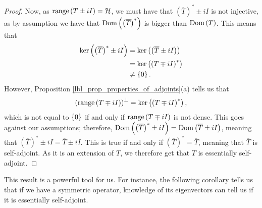 \begin{proof}
  Now, as $\operatorname{range}\left(T \pm iI\right) = \mathcal{H}$, we must have that $\left( \overline{T} \right)^* \pm iI$ is not injective, as by assumption we have that $\operatorname{Dom}\left(\left(\overline{T}\right)^*\right)$ is bigger than $\operatorname{Dom}\left(T\right)$. This means that
  \begin{align*}
    \operatorname{ker}\left(\left( \overline{T} \right)^* \pm iI\right)
    &=
    \operatorname{ker}\left(\left( \overline{T} \pm iI \right)\right) \\
    &=
    \operatorname{ker}\left(\left({T} \mp iI \right)^*\right) \\
    &\neq \left\{0\right\}.
  \end{align*}
  However, Proposition \eqref{lbl_prop_properties_of_adjoints}(a) tells us that
  \begin{equation*}
    \left( \operatorname{range}\left(T \mp iI\right) \right)^\perp
    =
    \operatorname{ker}\left(\left( T \mp iI \right)^*\right),
  \end{equation*}
  which is not equal to $\left\{0\right\}$ if and only if $\operatorname{range}\left(T \mp iI\right)$ is not dense. This goes against our assumptions; therefore, $\operatorname{Dom}\left(\left( \overline{T}\right)^* \pm iI\right) = \operatorname{Dom}\left(\overline{T} \pm iI\right)$, meaning that $ \left( \overline{T}\right)^* \pm iI = \overline{T} \pm iI $. This is true if and only if $\left( \overline{T}\right)^* = \overline{T}$, meaning that $\overline{T}$ is self-adjoint. As it is an extension of $T$, we therefore get that $T$ is essentially self-adjoint.
\end{proof}

This result is a powerful tool for us. For instance, the following corollary tells us that if we have a symmetric operator, knowledge of its eigenvectors can tell us if it is essentially self-adjoint.

